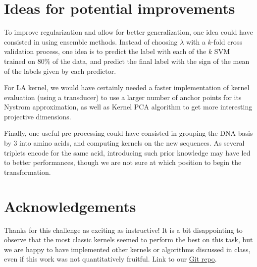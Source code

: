 \documentclass[11pt,twocolumn,letterpaper]{article}
\begin{document}
\section{Ideas for potential improvements}

To improve regularization and allow for better generalization, one idea could have consisted in using ensemble methods. Instead of choosing $\lambda$ with a $k$-fold cross validation process, one idea is to predict the label with each of the $k$ SVM trained on $80\%$ of the data, and predict the final label with the sign of the mean of the labels given by each predictor. 

For LA kernel, we would have certainly needed a faster implementation of kernel evaluation (using a transducer) to use a larger number of anchor points for its Nystrom approximation, as well as Kernel PCA algorithm to get more interesting projective dimensions. 

Finally, one useful pre-processing could have consisted in grouping the DNA basis by 3 into amino acids, and computing kernels on the new sequences. As several triplets encode for the same acid, introducing such prior knowledge may have led to better performances, though we are not sure at which position to begin the transformation.

\section{Acknowledgements}

Thanks for this challenge as exciting as instructive! It is a bit disappointing to observe that the most classic kernels seemed to perform the best on this task, but we are happy to have implemented other kernels or algorithms discussed in class, even if this work was not quantitatively fruitful. Link to our \href{https://github.com/AmineKheldouni/Kernel-in-Machine-Learning}{Git repo}.

\begin{thebibliography}{5}  

\small \printbibliography[heading=none]

\end{thebibliography}
\end{document}
